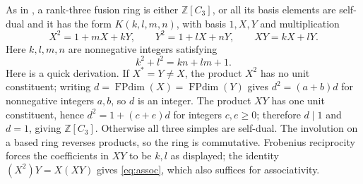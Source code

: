 \documentclass[11pt,a4paper]{article}
\theoremstyle{definition}
\theoremstyle{remark}
\newcommand{\Z}{\mathbb Z}
\newcommand{\FPdim}{\operatorname{FPdim}}
\numberwithin{equation}{section}
\begin{document}
As in \cite[Proposition~3.1]{Ostrik}, a rank-three fusion ring is either $\Z[C_3]$, or all its basis elements are self-dual and it has the form $K(k,l,m,n)$, with basis $1,X,Y$ and multiplication
\begin{equation}\label{eq:ring}
 X^2=1+mX+kY,\qquad Y^2=1+lX+nY,\qquad XY=kX+lY.
\end{equation}
Here $k,l,m,n$ are nonnegative integers satisfying
\begin{equation}\label{eq:assoc}
 k^2+l^2=kn+lm+1.
\end{equation}
Here is a quick derivation. If $X^*=Y\ne X$, the product $X^2$ has no
unit constituent; writing $d=\FPdim(X)=\FPdim(Y)$ gives
$d^2=(a+b)d$ for nonnegative integers $a,b$, so $d$ is an integer.
The product $XY$ has one unit constituent, hence
$d^2=1+(c+e)d$ for integers $c,e\geq0$; therefore $d\mid1$ and
$d=1$, giving $\Z[C_3]$. Otherwise all three simples are self-dual.
The involution on a based ring reverses products, so the ring is
commutative. Frobenius reciprocity forces the coefficients in $XY$
to be $k,l$ as displayed; the identity $(X^2)Y=X(XY)$ gives
\eqref{eq:assoc}, which also suffices for associativity.
\end{document}
